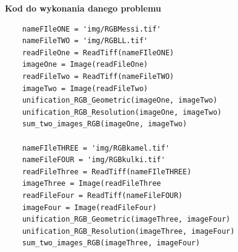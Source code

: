 \documentclass[magisterska,openany]{pracadypl}
\begin{document}
\newpage
\vspace{0.5cm}
\textbf{\Large Kod do wykonania danego problemu}
\lstset{language=Python}
\vspace{0.25cm}
\begin{lstlisting}
	nameFIleONE = 'img/RGBMessi.tif'
	nameFileTWO = 'img/RGBLL.tif'
	readFileOne = ReadTiff(nameFIleONE)
	imageOne = Image(readFileOne)
	readFileTwo = ReadTiff(nameFileTWO)
	imageTwo = Image(readFileTwo)
	unification_RGB_Geometric(imageOne, imageTwo)
	unification_RGB_Resolution(imageOne, imageTwo)
	sum_two_images_RGB(imageOne, imageTwo)
	
	nameFIleTHREE = 'img/RGBkamel.tif'
	nameFileFOUR = 'img/RGBkulki.tif'
	readFileThree = ReadTiff(nameFIleTHREE)
	imageThree = Image(readFileThree
	readFileFour = ReadTiff(nameFileFOUR)
	imageFour = Image(readFileFour)
	unification_RGB_Geometric(imageThree, imageFour)
	unification_RGB_Resolution(imageThree, imageFour)
	sum_two_images_RGB(imageThree, imageFour)

\end{lstlisting}
\end{document}
